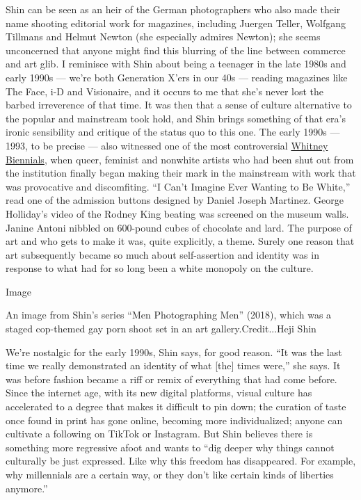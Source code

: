 Shin can be seen as an heir of the German photographers who also made
their name shooting editorial work for magazines, including Juergen
Teller, Wolfgang Tillmans and Helmut Newton (she especially admires
Newton); she seems unconcerned that anyone might find this blurring of
the line between commerce and art glib. I reminisce with Shin about
being a teenager in the late 1980s and early 1990s --- we're both
Generation X'ers in our 40s --- reading magazines like The Face, i-D and
Visionaire, and it occurs to me that she's never lost the barbed
irreverence of that time. It was then that a sense of culture
alternative to the popular and mainstream took hold, and Shin brings
something of that era's ironic sensibility and critique of the status
quo to this one. The early 1990s --- 1993, to be precise --- also
witnessed one of the most controversial
\href{https://www.nytimes3xbfgragh.onion/interactive/2019/07/05/arts/design/whitney-biennial-maps.html}{Whitney
Biennials}, when queer, feminist and nonwhite artists who had been shut
out from the institution finally began making their mark in the
mainstream with work that was provocative and discomfiting. ``I Can't
Imagine Ever Wanting to Be White,'' read one of the admission buttons
designed by Daniel Joseph Martinez. George Holliday's video of the
Rodney King beating was screened on the museum walls. Janine Antoni
nibbled on 600-pound cubes of chocolate and lard. The purpose of art and
who gets to make it was, quite explicitly, a theme. Surely one reason
that art subsequently became so much about self-assertion and identity
was in response to what had for so long been a white monopoly on the
culture.

Image

An image from Shin's series ``Men Photographing Men'' (2018), which was
a staged cop-themed gay porn shoot set in an art gallery.Credit...Heji
Shin

We're nostalgic for the early 1990s, Shin says, for good reason. ``It
was the last time we really demonstrated an identity of what {[}the{]}
times were,'' she says. It was before fashion became a riff or remix of
everything that had come before. Since the internet age, with its new
digital platforms, visual culture has accelerated to a degree that makes
it difficult to pin down; the curation of taste once found in print has
gone online, becoming more individualized; anyone can cultivate a
following on TikTok or Instagram. But Shin believes there is something
more regressive afoot and wants to ``dig deeper why things cannot
culturally be just expressed. Like why this freedom has disappeared. For
example, why millennials are a certain way, or they don't like certain
kinds of liberties anymore.''

